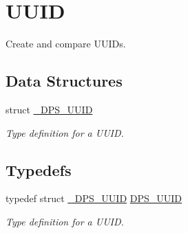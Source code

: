 \hypertarget{group__uuid}{}\section{U\+U\+ID}
\label{group__uuid}


Create and compare U\+U\+I\+Ds.  


\subsection*{Data Structures}
\begin{DoxyCompactItemize}
\item 
struct \hyperlink{struct___d_p_s___u_u_i_d}{\+\_\+\+D\+P\+S\+\_\+\+U\+U\+ID}
\begin{DoxyCompactList}\small\item\em Type definition for a U\+U\+ID. \end{DoxyCompactList}\end{DoxyCompactItemize}
\subsection*{Typedefs}
\begin{DoxyCompactItemize}
\item 
\mbox{\label{group__uuid_gaef1d03afcc6410602ade1d48f24c3997}} 
typedef struct \hyperlink{struct___d_p_s___u_u_i_d}{\+\_\+\+D\+P\+S\+\_\+\+U\+U\+ID} \hyperlink{group__uuid_gaef1d03afcc6410602ade1d48f24c3997}{D\+P\+S\+\_\+\+U\+U\+ID}
\begin{DoxyCompactList}\small\item\em Type definition for a U\+U\+ID. \end{DoxyCompactList}\end{DoxyCompactItemize}
